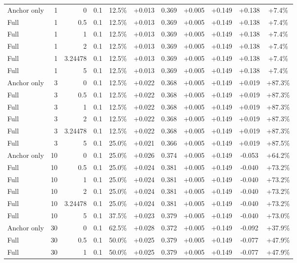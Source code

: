 \begin{table}[htbp]
\begin{tabular}{lrrrccccccc}
Anchor only & 1 & 0 & 0.1 & 12.5\% & +0.013 & 0.369 & +0.005 & +0.149 & +0.138 & +7.4\% \\
Full & 1 & 0.5 & 0.1 & 12.5\% & +0.013 & 0.369 & +0.005 & +0.149 & +0.138 & +7.4\% \\
Full & 1 & 1 & 0.1 & 12.5\% & +0.013 & 0.369 & +0.005 & +0.149 & +0.138 & +7.4\% \\
Full & 1 & 2 & 0.1 & 12.5\% & +0.013 & 0.369 & +0.005 & +0.149 & +0.138 & +7.4\% \\
Full & 1 & 3.24478 & 0.1 & 12.5\% & +0.013 & 0.369 & +0.005 & +0.149 & +0.138 & +7.4\% \\
Full & 1 & 5 & 0.1 & 12.5\% & +0.013 & 0.369 & +0.005 & +0.149 & +0.138 & +7.4\% \\
Anchor only & 3 & 0 & 0.1 & 12.5\% & +0.022 & 0.368 & +0.005 & +0.149 & +0.019 & +87.3\% \\
Full & 3 & 0.5 & 0.1 & 12.5\% & +0.022 & 0.368 & +0.005 & +0.149 & +0.019 & +87.3\% \\
Full & 3 & 1 & 0.1 & 12.5\% & +0.022 & 0.368 & +0.005 & +0.149 & +0.019 & +87.3\% \\
Full & 3 & 2 & 0.1 & 12.5\% & +0.022 & 0.368 & +0.005 & +0.149 & +0.019 & +87.3\% \\
Full & 3 & 3.24478 & 0.1 & 12.5\% & +0.022 & 0.368 & +0.005 & +0.149 & +0.019 & +87.3\% \\
Full & 3 & 5 & 0.1 & 25.0\% & +0.021 & 0.366 & +0.005 & +0.149 & +0.019 & +87.5\% \\
Anchor only & 10 & 0 & 0.1 & 25.0\% & +0.026 & 0.374 & +0.005 & +0.149 & -0.053 & +64.2\% \\
Full & 10 & 0.5 & 0.1 & 25.0\% & +0.024 & 0.381 & +0.005 & +0.149 & -0.040 & +73.2\% \\
Full & 10 & 1 & 0.1 & 25.0\% & +0.024 & 0.381 & +0.005 & +0.149 & -0.040 & +73.2\% \\
Full & 10 & 2 & 0.1 & 25.0\% & +0.024 & 0.381 & +0.005 & +0.149 & -0.040 & +73.2\% \\
Full & 10 & 3.24478 & 0.1 & 25.0\% & +0.024 & 0.381 & +0.005 & +0.149 & -0.040 & +73.2\% \\
Full & 10 & 5 & 0.1 & 37.5\% & +0.023 & 0.379 & +0.005 & +0.149 & -0.040 & +73.0\% \\
Anchor only & 30 & 0 & 0.1 & 62.5\% & +0.028 & 0.372 & +0.005 & +0.149 & -0.092 & +37.9\% \\
Full & 30 & 0.5 & 0.1 & 50.0\% & +0.025 & 0.379 & +0.005 & +0.149 & -0.077 & +47.9\% \\
Full & 30 & 1 & 0.1 & 50.0\% & +0.025 & 0.379 & +0.005 & +0.149 & -0.077 & +47.9\% \\

\end{tabular}
\end{table}
